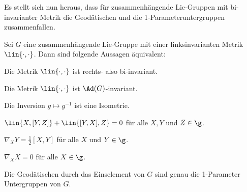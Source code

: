 \documentclass[%
	paper=a5,%
	fleqn,%
	DIV=18,%
	BCOR=0mm,
	fontsize=11pt,
	titlepage=false,%
	bibliography=totoc,
	DIV=18,%
	twoside=true,
	pdftitle=Riemannsche Geometrie,
	pdfauthor=Uwe Semmelmann,
	numbers=noendperiod]%
	{scrbook}
\begin{document}
Es stellt sich nun heraus, dass für zusammenhängende Lie-Gruppen mit bi-invarianter Metrik die Geodätischen und die 1-Parameteruntergruppen zusammenfallen. 

\begin{prop}
Sei $G$ eine zusammenhängende Lie-Gruppe mit einer linksinvarianten Metrik $\lin{\cdot,\cdot}$. Dann sind folgende Aussagen äquivalent:
\begin{equivenum}
\item Die Metrik $\lin{\cdot,\cdot}$ ist rechts- also bi-invariant.
\item Die Metrik $\lin{\cdot,\cdot}$ ist $\Ad(G)$-invariant.
\item Die Inversion $g\mapsto g^{-1}$ ist eine Isometrie.
\item $\lin{X,[Y,Z]} + \lin{[Y,X],Z} = 0$ für alle $X,Y$ und $Z\in \g$.
\item $\nabla_{X} Y = \frac{1}{2}[X,Y]$ für alle $X$ und $Y\in \g$.
\item $\nabla_{X} X = 0$ für alle $X\in \g$.
\item Die Geodätischen durch das Einselement von $G$ sind genau die 1-Parameter Untergruppen von $G$.\fish
\end{equivenum}
\end{prop}
\end{document}
